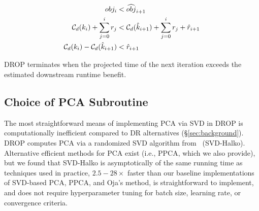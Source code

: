 \vspace{-.4cm}
\begin{align}
  obj_i &< \widehat{obj}_{i+1} \nonumber \\
  \mathcal{C}_{\color{black}d}(k_i) + \sum_{j=0}^i r_j &< \mathcal{C}_{\color{black}d}(\hat{k}_{i+1}) + \sum_{j=0}^{i} r_j + \hat{r}_{i+1} \nonumber \\
  \mathcal{C}_{\color{black}d}(k_i) - \mathcal{C}_{\color{black}d}(\hat{k}_{i+1}) &< \hat{r}_{i+1}  \label{eq:check}
\end{align}

DROP terminates when the projected time of the next iteration exceeds the estimated downstream runtime benefit. 

\subsection{Choice of PCA Subroutine}
\label{subsec:pcaroutine}

The most straightforward means of implementing PCA via SVD in DROP is computationally inefficient compared to DR alternatives (\S\ref{sec:background}).  
DROP computes PCA via a randomized SVD algorithm from~\cite{tropp} (SVD-Halko).
Alternative efficient methods for PCA exist (i.e., PPCA, which we also provide), but we found that SVD-Halko is asymptotically of the same running time as techniques used in practice, $2.5-28\times$ faster than our baseline implementations of SVD-based PCA, PPCA, and Oja's method, is straightforward to implement, and does not require hyperparameter tuning for batch size, learning rate, or convergence criteria.  

